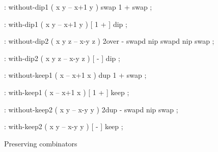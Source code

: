 \centering

\begin{minipage}{0.65\linewidth}
  \begin{factorcode}
    : without-dip1 ( x y -- x+1 y )
      swap 1 + swap ;

    : with-dip1 ( x y -- x+1 y )
      [ 1 + ] dip ;
    
    : without-dip2 ( x y z -- x-y z )
      2over - swapd nip swapd nip swap ;

    : with-dip2 ( x y z -- x-y z )
      [ - ] dip ;

    : without-keep1 ( x -- x+1 x )
      dup 1 + swap ;

    : with-keep1 ( x -- x+1 x )
      [ 1 + ] keep ;

    : without-keep2 ( x y -- x-y y )
      2dup - swapd nip swap ;

    : with-keep2 ( x y -- x-y y )
      [ - ] keep ;
  \end{factorcode}
\end{minipage}

\caption{Preserving combinators}
